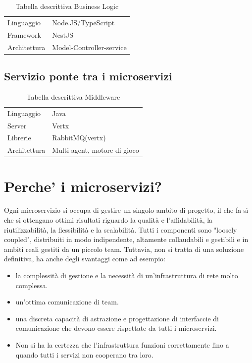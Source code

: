 \begin{table}[h!]
    \centering
    \caption{Tabella descrittiva Business Logic}
    \label{tab:bl_serv_table}
    \begin{tabular}{ll}     
        \toprule                   
        Linguaggio & Node.JS/TypeScript \\        
        Framework & NestJS   \\                   
        Architettura & Model-Controller-service  \\
        \bottomrule
    \end{tabular}
\end{table}

\subsection{Servizio ponte tra i microservizi}


\begin{table}[h!]
    \centering
    \caption{Tabella descrittiva Middleware}
    \label{tab:middleware_serv_table}
    \begin{tabular}{ll}     
        \toprule                   
        Linguaggio & Java \\        
        Server & Vertx \\
        Librerie & RabbitMQ(vertx) \\
        Architettura & Multi-agent, motore di gioco \\
        \bottomrule
    \end{tabular}
\end{table}

\section{Perche' i microservizi?}

Ogni microservizio si occupa di gestire un singolo ambito di progetto, il che fa sì che si ottengano ottimi risultati riguardo la qualità e l'affidabilità, la riutilizzabilità, la flessibilità e la scalabilità.
Tutti i componenti sono "loosely coupled", distribuiti in modo indipendente, altamente collaudabili e gestibili e in ambiti reali gestiti da un piccolo team.
Tuttavia, non si tratta di una soluzione definitiva, ha anche degli svantaggi come ad esempio:
\begin{itemize}
    \item la complessità di gestione e la necessità di un'infrastruttura di rete molto complessa.
    \item un'ottima comunicazione di team.
    \item una discreta capacità di astrazione e progettazione di interfaccie di comunicazione che devono essere rispettate da tutti i microservizi.
    \item Non si ha la certezza che l'infrastruttura funzioni correttamente fino a quando tutti i servizi non cooperano tra loro.
\end{itemize}

